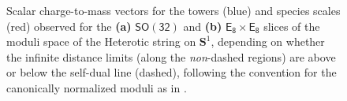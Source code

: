 \begin{figure}
\begin{center}
        \quad
	\caption{\small Scalar charge-to-mass vectors for the towers (blue) and species scales (red) observed for the \textbf{(a)} $\mathsf{SO(32)}$ and \textbf{(b)} $\mathsf{E_8\times E_8}$ slices of the moduli space of the Heterotic string on $\mathbf{S}^1$, depending on whether the infinite distance limits (along the \emph{non}-dashed regions) are above or below the self-dual line (dashed), following the convention for the canonically normalized moduli as in \cite{Etheredge:2023odp}.}\label{fig:hets1}
\end{center}
\end{figure}

